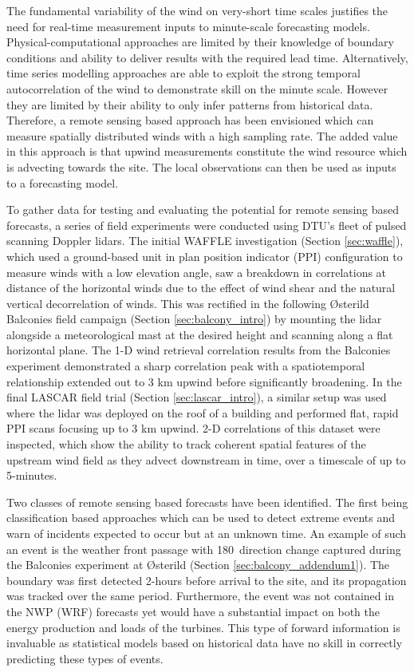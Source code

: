 The fundamental variability of the wind on very-short time scales justifies the need for real-time measurement inputs to minute-scale forecasting models. Physical-computational approaches are limited by their knowledge of boundary conditions and ability to deliver results with the required lead time. Alternatively, time series modelling approaches are able to exploit the strong temporal autocorrelation of the wind to demonstrate skill on the minute scale. However they are limited by their ability to only infer patterns from historical data. Therefore, a remote sensing based approach has been envisioned which can measure spatially distributed winds with a high sampling rate. The added value in this approach is that upwind measurements constitute the wind resource which is advecting towards the site. The local observations can then be used as inputs to a forecasting model.

To gather data for testing and evaluating the potential for remote sensing based forecasts, a series of field experiments were conducted using DTU's fleet of pulsed scanning Doppler lidars. The initial WAFFLE investigation (Section \ref{sec:waffle}), which used a ground-based unit in plan position indicator (PPI) configuration to measure winds with a low elevation angle, saw a breakdown in correlations at distance of the horizontal winds due to the effect of wind shear and the natural vertical decorrelation of winds.
This was rectified in the following {\O}sterild Balconies field campaign (Section \ref{sec:balcony_intro}) by mounting the lidar alongside a meteorological mast at the desired height and scanning along a flat horizontal plane. The 1-D wind retrieval correlation results from the Balconies experiment demonstrated a sharp correlation peak with a spatiotemporal relationship extended out to 3 km upwind before significantly broadening. In the final LASCAR field trial (Section \ref{sec:lascar_intro}), a similar setup was used where the lidar was deployed on the roof of a building and performed flat, rapid PPI scans focusing up to 3 km upwind. 2-D correlations of this dataset were inspected, which show the ability to track coherent spatial features of the upstream wind field as they advect downstream in time, over a timescale of up to 5-minutes.

Two classes of remote sensing based forecasts have been identified. The first being classification based approaches which can be used to detect extreme events and warn of incidents expected to occur but at an unknown time. An example of such an event is the weather front passage with 180\degree \ direction change captured during the Balconies experiment at {\O}sterild (Section \ref{sec:balcony_addendum1}). The boundary was first detected 2-hours before arrival to the site, and its propagation was tracked over the same period. Furthermore, the event was not contained in the NWP (WRF) forecasts yet would have a substantial impact on both the energy production and loads of the turbines. This type of forward information is invaluable as statistical models based on historical data have no skill in correctly predicting these types of events.

